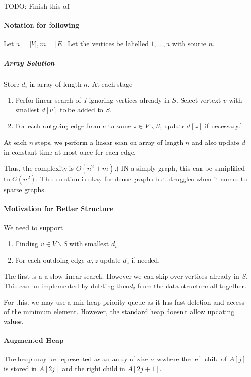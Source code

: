 TODO: Finish this off

\paragraph{Notation for following}
Let \(n = |V|, m = |E|\). Let the vertices be labelled \(1, \ldots, n\)
with source \(n\).

\subparagraph{Array Solution}
Store \(d_i\) in array of length \(n\). At each stage
\begin{enumerate}
    \item Perfor linear search of \(d\) ignoring vertices already in \(S\).
        Select vertext \(v\) with smallest \(d[v]\) to be added to \(S\).
    \item For each outgoing edge from \(v\) to some \(z \in V \backslash S\),
        update \(d[z]\) if necessary.]
\end{enumerate}

At each \(n\) steps, we perform a linear scan on array of length \(n\)
and also update \(d\) in constant time at most once for each edge.

Thus, the complexity is \(O(n^2 + m)\).) IN a simply graph, this can be
simiplified to \(O(n^2)\).
This solution is okay for dense graphs but struggles when it comes to
sparse graphs.

\paragraph{Motivation for Better Structure}
We need to support
\begin{enumerate}
    \item Finding \(v\in V \backslash S\) with smallest \(d_v\)
    \item For each outdoing edge \(w, z\) update \(d_z\) if needed.
\end{enumerate}
The first is a a slow linear search. However we can skip over vertices
already in \(S\). This can be implemented by deleting theo\(d_v\)
from the data structure all together.

For this, we may use a min-heap priority queue as it has fast deletion
and access of the minimum element. However, the standard heap doesn't
allow updating values.

\paragraph{Augmented Heap}
The heap may be represented as an array of size \(n\) wwhere the left child
of \(A[j]\) is stored in \(A[2j]\) and the right child in \(A[2j + 1]\).

